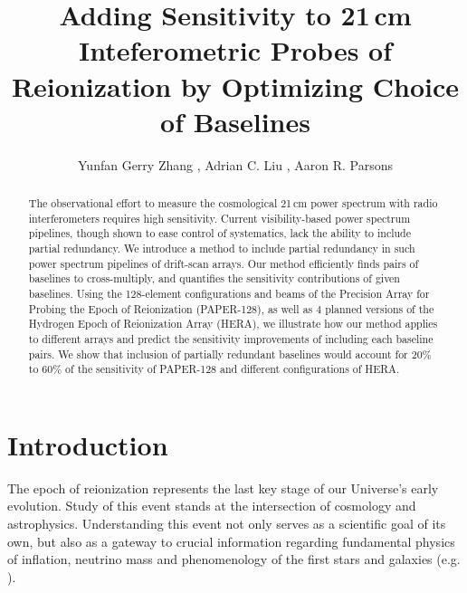\documentclass[twocolumn,apj,numberedappendix]{emulateapj}
\renewcommand\[{\begin{equation}}
\renewcommand\]{\end{equation}}
\begin{document}
\title{Adding Sensitivity to 21\,cm Inteferometric Probes of Reionization by Optimizing Choice of Baselines}

\author{
Yunfan Gerry Zhang ,
Adrian C. Liu ,
Aaron R. Parsons
}


\begin{abstract}
The observational effort to measure the cosmological 21\,cm power spectrum with radio interferometers requires high sensitivity. Current visibility-based power spectrum pipelines, though shown to ease control of systematics, lack the ability to include partial redundancy. We introduce a method to include partial redundancy in such power spectrum pipelines of drift-scan arrays. Our method efficiently finds pairs of baselines to cross-multiply, and quantifies the sensitivity contributions of given baselines. 
Using the 128-element configurations and beams of the Precision Array for Probing the Epoch of Reionization (PAPER-128), as well as 4 planned versions of the Hydrogen Epoch of Reionization Array (HERA), we illustrate how our method applies to different arrays and predict the sensitivity improvements of including each baseline pairs. We show that inclusion of partially redundant baselines 
would account for $20\%$ to $60\%$ of the sensitivity of PAPER-128 and different configurations of HERA. 
\end{abstract}

\section{Introduction}

The epoch of reionization represents the last key
stage of our Universe's early evolution. Study of this event stands at
the intersection of cosmology and astrophysics. Understanding this
event not only serves as a scientific goal
of its own, but also as a gateway to crucial information
regarding fundamental physics of inflation, neutrino mass and phenomenology
of the first stars and galaxies (e.g. \citealt{LiuOpticalDepth, Liu2016b, Mao2008, DEw21cm, Bull2015, Oyama20131186}). 
\end{document}
